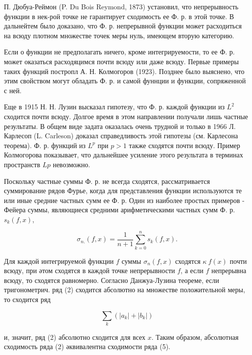 \documentclass[10pt]{article}
\begin{document}
П. Дюбуа-Реймон (P. Du Bois Reymond, 1873) установил, что непрерывность функции в нек-рой точке не гарантирует сходимость ее Ф. р. в этой точке. В дальнейтем было доказано, что Ф. р. непрерывной функции может расходиться на всюду плотном множестве точек меры нуль, имеющем вторую категорию.



Если о функции не предполагать ничего, кроме интегрируемости, то ее Ф. р. может оказаться расходяцимся почти всюду или даже всюду. Первые примеры таких функций постропл А. Н. Колмогоров (1923). Позднее было выяснено, что этим свойством могут обладать Ф. р. и самой фуннции и функции, сопряженной с ней.



Еще в 1915 Н. Н. Лузин высказал гипотезу, что Ф. р. каждой функции из $L^{2}$ сходится почти всюду. Долгое время в этом направлении получали лишь частные результаты. В общем виде задата оказалась очень трудной и только в 1966 Л. Карлесоп (L. Carleson) доказал справедливость этой гипотезы (см. Карлесона теорема). Ф. р. функций из $L^{p}$ при $p>1$ также сходятся почти всюду. Пример Колмогорова показывает, что дальнейшее усиление этого результата в терминах пространств $L p$ невозможно.



Поскольку частные суммы Ф. р. не всегда сходятся, рассматривается суммирование рядов Фурье, когда для представления функции используются те или иные средние частных сумм ее Ф. р. Один из наиболее простых примеров - Фейера суммы, являющиеся средними арифметическими частных сумм Ф. р. $s_{k}(f, x)$,



\[

\sigma_{n .}(f, x)=\frac{1}{n+1} \sum_{k=0}^{n} s_{k}(f, x) .

\]



Для каждой интегрируемой функции $f$ суммы $\sigma_{n}(f, x)$ сходятся $\kappa ~ f(x)$ почти всюду, при әтом сходятся в каждой точке непрерывности $f$, а если $f$ непрерывна всюду, то сходятся равномерно. Согласно Данжуа-Лузина теореме, если тригонометрич. ряд (2) сходится абсолютно на множестве положительной меры, то сходится ряд



\[

\sum_{k}\left(\left|a_{k}\right|+\left|b_{k}\right|\right)

\]



и, значит, ряд (2) абсолютно сходится для всех $x$. Таким образом, абсолютная сходимость ряда (2) әквивалентна сходимости ряда (5).
\end{document}
